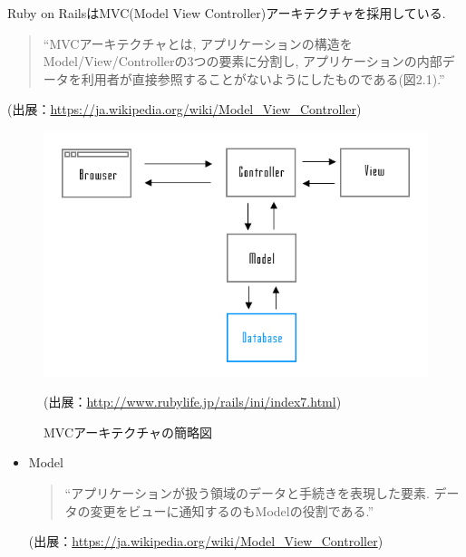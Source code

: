 \begin{description}
Ruby on RailsはMVC(Model View Controller)アーキテクチャを採用している.

\begin{quotation}
\begin{screen}
“MVCアーキテクチャとは, アプリケーションの構造をModel/View/Controllerの3つの要素に分割し, アプリケーションの内部データを利用者が直接参照することがないようにしたものである(図2.1).”
\end{screen}
\end{quotation}
\begin{flushright}
(出展：\url{https://ja.wikipedia.org/wiki/Model_View_Controller})
\end{flushright}

\begin{figure}
\begin{center}
\includegraphics[width=13cm]{fig/mvc.png}
\caption{MVCアーキテクチャの簡略図}
\end{center}
\begin{flushright}
(出展：\url{http://www.rubylife.jp/rails/ini/index7.html})
\end{flushright}
\end{figure}

\begin{itemize}
\item Model

\begin{quotation}
\begin{screen}
“アプリケーションが扱う領域のデータと手続きを表現した要素.
データの変更をビューに通知するのもModelの役割である.”
\end{screen}
\end{quotation}
\begin{flushright}
(出展：\url{https://ja.wikipedia.org/wiki/Model_View_Controller})
\end{flushright}


\end{itemize}
\end{description}

